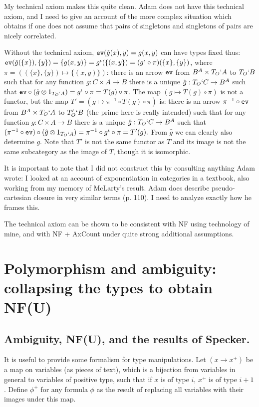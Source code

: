 \documentclass[12pt]{article}
\begin{document}
My technical axiom makes this quite clean.  Adam does not have this technical axiom, and I need to give an account of the more complex situation which obtains if one does not assume that pairs of singletons and singletons of pairs are nicely correlated.

Without the technical axiom,   ${\tt ev}(\hat g(x),y) = g(x,y)$ can have types fixed thus:  ${\tt ev}(\hat g(\{x\}),\{y\}) = \{g(x,y)\} = g^{\iota}(\{(x,y\}) = (g^{\iota} \circ \pi)(\{x\},\{y\})$, where $\pi = ((\{x\},\{y\}) \mapsto \{(x,y)\})$:   there is an arrow ${\tt ev}$ from $B^A \times T_O`A$  to $T_O`B$  such that for any function $g:C \times A \rightarrow B$ there is a unique
$\hat g :T_O`C \rightarrow B^A$ such that ${\tt ev} \circ (\hat g \otimes 1_{T_O`A}) = g^\iota \circ \pi = T(g)\circ \pi$.  The map $(g \mapsto T(g) \circ \pi)$ is not a functor, but the map
$T' = (g \mapsto \pi^{-1} \circ T(g) \circ \pi)$ is:   there is an arrow ${\pi^{-1} \circ \tt ev}$ from $B^A \times T_O`A$ to $T'_O`B$ (the prime here is really intended) such that for any function $g:C \times A \rightarrow B$ there is a unique
$\hat g :T_O`C \rightarrow B^A$ such that $(\pi^{-1} \circ {\tt ev}) \circ (\hat g \otimes 1_{T_O`A}) = \pi^{-1} \circ g^\iota \circ \pi = T'(g).$   From $\hat g$ we can clearly also determine $g$.  Note that $T'$ is not the same functor as $T$ and its image is not the same subcategory as the image of $T$, though it is isomorphic. 

It is important to note that I did not construct this by consulting anything Adam wrote:  I looked at an account of exponentiation in categories in a textbook, also working from my memory of McLarty's result.  Adam does describe pseudo-cartesian closure in very similar terms (p. 110).  I need to analyze exactly how he frames this.

The technical axiom can be shown to be consistent with NF using technology of mine, and with NF + AxCount under quite strong additional assumptions.  

\section{Polymorphism and ambiguity: collapsing the types to obtain NF(U)}

\subsection{Ambiguity, NF(U), and the results of Specker.}

It is useful to provide some formalism for type manipulations.  Let $(x \rightarrow x^+)$ be a map on variables (as pieces of text), which is a bijection from variables in general to variables of positive type,
such that if $x$ is of type $i$, $x^+$ is of type $i+1$.  Define $\phi^+$ for any formula $\phi$ as the result of replacing all variables with their images under this map.
\end{document}
